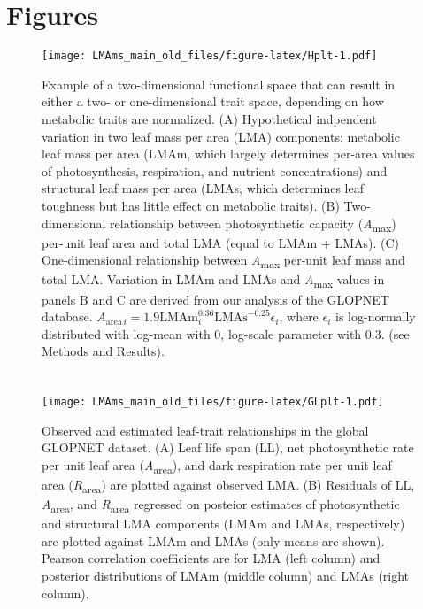 \documentclass[
  12pt,
]{article}
\begin{document}
\newpage

\hypertarget{figures}{%
\section{Figures}\label{figures}}

\begin{figure}
\centering
\texttt{[image: LMAms\_main\_old\_files/figure-latex/Hplt-1.pdf]}
\caption{\label{fig:Hplt}Example of a two-dimensional functional space that can result in either a two- or one-dimensional trait space, depending on how metabolic traits are normalized. (A) Hypothetical indpendent variation in two leaf mass per area (LMA) components: metabolic leaf mass per area (LMAm, which largely determines per-area values of photosynthesis, respiration, and nutrient concentrations) and structural leaf mass per area (LMAs, which determines leaf toughness but has little effect on metabolic traits). (B) Two-dimensional relationship between photosynthetic capacity (\emph{A}\textsubscript{max}) per-unit leaf area and total LMA (equal to LMAm + LMAs). (C) One-dimensional relationship between \emph{A}\textsubscript{max} per-unit leaf mass and total LMA. Variation in LMAm and LMAs and \emph{A}\textsubscript{max} values in panels B and C are derived from our analysis of the GLOPNET database. \(A_{\mathrm{area} \, i}=1.9\mathrm{LMAm}_i^{0.36}\mathrm{LMAs}^{-0.25}\epsilon_i\), where \(\epsilon_i\) is log-normally distributed with log-mean with 0, log-scale parameter with 0.3. (see Methods and Results).}
\end{figure}

\newpage

\hypertarget{section-2}{%
\section{}\label{section-2}}

\begin{figure}
\centering
\texttt{[image: LMAms\_main\_old\_files/figure-latex/GLplt-1.pdf]}
\caption{\label{fig:GLplt}Observed and estimated leaf-trait relationships in the global GLOPNET dataset. (A) Leaf life span (LL), net photosynthetic rate per unit leaf area (\emph{A}\textsubscript{area}), and dark respiration rate per unit leaf area (\emph{R}\textsubscript{area}) are plotted against observed LMA. (B) Residuals of LL, \emph{A}\textsubscript{area}, and \emph{R}\textsubscript{area} regressed on posteior estimates of photosynthetic and structural LMA components (LMAm and LMAs, respectively) are plotted against LMAm and LMAs (only means are shown). Pearson correlation coefficients are for LMA (left column) and posterior distributions of LMAm (middle column) and LMAs (right column).}
\end{figure}
\end{document}
